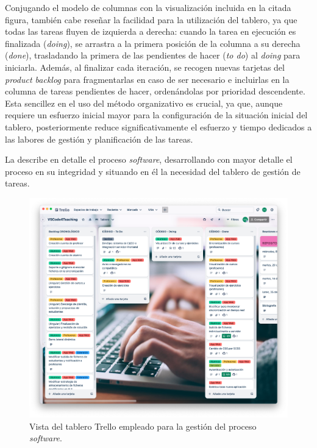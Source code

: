 Conjugando el modelo de columnas con la visualización incluida en la citada figura, también cabe reseñar la facilidad para la utilización del tablero, ya que todas las tareas fluyen de izquierda a derecha: cuando la tarea en ejecución es finalizada (\textit{doing}), se arrastra a la primera posición de la columna a su derecha (\textit{done}), trasladando la primera de las pendientes de hacer (\textit{to do}) al \textit{doing} para iniciarla. Además, al finalizar cada iteración, se recogen nuevas tarjetas del \textit{product backlog} para fragmentarlas en caso de ser necesario e incluirlas en la columna de tareas pendientes de hacer, ordenándolas por prioridad descendente. Esta sencillez en el uso del método organizativo es crucial, ya que, aunque requiere un esfuerzo inicial mayor para la configuración de la situación inicial del tablero, posteriormente reduce significativamente el esfuerzo y tiempo dedicados a las labores de gestión y planificación de las tareas.

La  describe en detalle el proceso \textit{software}, desarrollando con mayor detalle el proceso en su integridad y situando en él la necesidad del tablero de gestión de tareas.

\begin{figure}[ht]
    \centering
    \includegraphics[width=\textwidth]{imagenes/utilizadas/3-2-herramientas/trello.png}
    \caption{Vista del tablero Trello empleado para la gestión del proceso \textit{software}.}
    \label{fig:tableroTrello}
\end{figure}